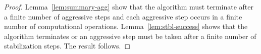 \documentclass{article}
\begin{document}
\begin{proof}
Lemma~\ref{lem:summary-agg} show that the algorithm must terminate after a finite number of aggressive steps and each aggressive step occurs in a finite number of computational operations.
Lemma~\ref{lem:stbl-success} shows that the algorithm terminates or an aggressive step must be taken after a finite number of stabilization steps. The result follows.
\end{proof}

%
%
%
%
\end{document}
